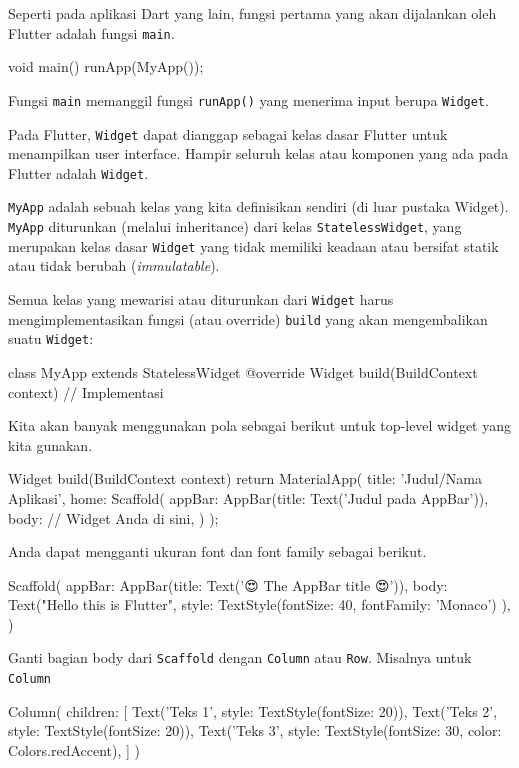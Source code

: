 \documentclass[a4paper,11pt]{article} %
\newcommand{\txtinline}[1]{\texttt{#1}}
\begin{document}
Seperti pada aplikasi Dart yang lain, fungsi pertama yang akan dijalankan
oleh Flutter adalah fungsi \txtinline{main}.
\begin{dartcode}
void main() {
  runApp(MyApp());
}
\end{dartcode}

Fungsi \txtinline{main} memanggil fungsi \txtinline{runApp()} yang menerima
input berupa \txtinline{Widget}.

Pada Flutter, \txtinline{Widget} dapat dianggap sebagai kelas dasar Flutter
untuk menampilkan user interface. Hampir seluruh kelas atau komponen yang ada
pada Flutter adalah \txtinline{Widget}.

\txtinline{MyApp} adalah sebuah kelas yang kita definisikan sendiri (di luar
pustaka Widget). \txtinline{MyApp} diturunkan (melalui inheritance) dari
kelas \txtinline{StatelessWidget}, yang merupakan kelas dasar \txtinline{Widget}
yang tidak memiliki keadaan atau bersifat statik atau tidak berubah
(\textit{immulatable}).

Semua kelas yang mewarisi atau diturunkan dari \txtinline{Widget} harus
mengimplementasikan fungsi (atau override) \txtinline{build} yang akan mengembalikan
suatu \txtinline{Widget}:
\begin{dartcode}
class MyApp extends StatelessWidget {
  @override
  Widget build(BuildContext context) {
    // Implementasi
  }
}
\end{dartcode}

Kita akan banyak menggunakan pola sebagai berikut untuk
top-level widget yang kita gunakan.
\begin{dartcode}
Widget build(BuildContext context) {
  return MaterialApp(
    title: 'Judul/Nama Aplikasi',
    home: Scaffold(
      appBar: AppBar(title: Text('Judul pada AppBar')),
      body: // Widget Anda di sini,
    )
  );
}
\end{dartcode}


Anda dapat mengganti ukuran font dan font family sebagai berikut.
\begin{dartcode}
Scaffold(
  appBar: AppBar(title: Text('😍 The AppBar title 😍')),
  body: Text("Hello this is Flutter",
    style: TextStyle(fontSize: 40, fontFamily: 'Monaco')
  ),
)
\end{dartcode}


Ganti bagian body dari \txtinline{Scaffold} dengan \txtinline{Column} atau \txtinline{Row}.
Misalnya untuk \txtinline{Column}
\begin{dartcode}
Column(
  children: [
    Text('Teks 1', style: TextStyle(fontSize: 20)),
    Text('Teks 2', style: TextStyle(fontSize: 20)),
    Text('Teks 3', style: TextStyle(fontSize: 30, color: Colors.redAccent),
  ]
)
\end{dartcode}
\end{document}
